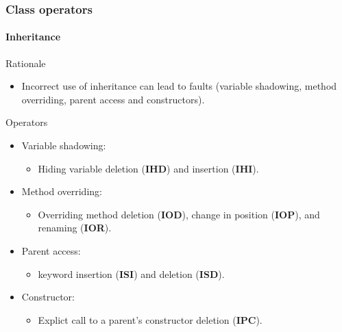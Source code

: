 \begin{frame}
\frametitle{Class operators}
\framesubtitle{Inheritance}


\begin{block:fact}{Rationale}
\begin{itemize}
	\item Incorrect use of inheritance can lead to faults (variable shadowing,
	method overriding, parent access and constructors).
\end{itemize}
\end{block:fact}

\begin{block:fact}{Operators}
\begin{itemize}
	\item Variable shadowing:
	\begin{itemize}
		\item Hiding variable deletion (\textbf{IHD}) and insertion
		(\textbf{IHI}).
	\end{itemize}

	\item Method overriding:
	\begin{itemize}
		\item Overriding method deletion (\textbf{IOD}), change in position
		(\textbf{IOP}), and renaming (\textbf{IOR}).
	\end{itemize}

	\item Parent access:
	\begin{itemize}
		\item {} keyword insertion (\textbf{ISI}) and deletion
		(\textbf{ISD}).
	\end{itemize}

	\item Constructor:
	\begin{itemize}
		\item Explict call to a parent's constructor deletion (\textbf{IPC}).
	\end{itemize}
\end{itemize}
\end{block:fact}
\end{frame}


